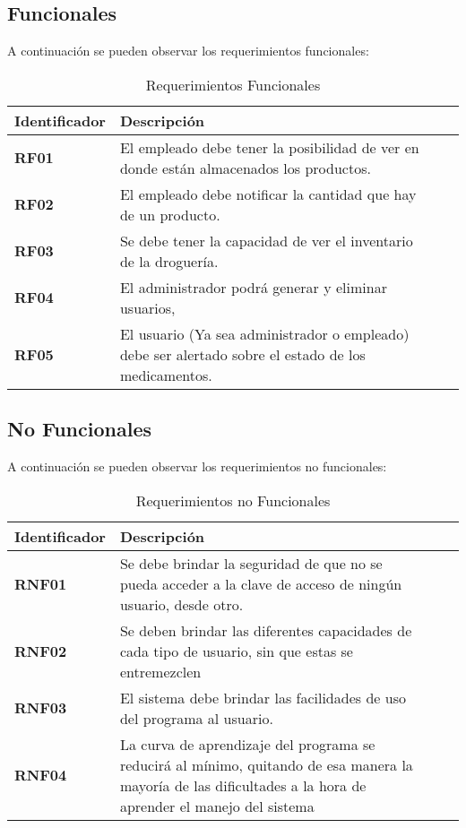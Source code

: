 \subsection{Funcionales}
A continuación se pueden observar los requerimientos funcionales: \\
\begin{table}[h!]
	\begin{center}
		\begin{tabular}{| l |p{10cm} | l |p{30cm}|} 
			\hline
			\textbf{Identificador} & \textbf{Descripci\'on} \\
			\hline
		\textbf{RF01} & El empleado debe tener la posibilidad de ver en donde están almacenados los productos.\\ \hline
		\textbf{RF02} & El empleado debe notificar la cantidad que hay de un producto.\\ \hline
		\textbf{RF03} & Se debe tener la capacidad de ver el inventario de la droguería.\\ \hline
		\textbf{RF04} & El administrador podrá generar y eliminar usuarios,\\ \hline
		\textbf{RF05} & El usuario (Ya sea administrador o empleado) debe ser alertado sobre el estado de los medicamentos.\\ \hline
		\end{tabular}
		\caption{Requerimientos Funcionales}
		\label{reqFunc}
	\end{center}
\end{table}

\newpage
\subsection{No Funcionales}
A continuación se pueden observar los requerimientos no funcionales: \\
\begin{table}[h!]
	\begin{center}
		\begin{tabular}{| l |p{10cm} | l |p{30cm}|} 
			\hline
			\textbf{Identificador} & \textbf{Descripci\'on} \\
			\hline
			\textbf{RNF01} & Se debe brindar la seguridad de que no se pueda acceder a la clave de acceso de ningún usuario, desde otro.\\ \hline
			\textbf{RNF02} & Se deben brindar las diferentes capacidades de cada tipo de usuario, sin que estas se entremezclen\\ \hline
			\textbf{RNF03} & El sistema debe brindar las facilidades de uso del programa al usuario.\\ \hline
			\textbf{RNF04} & La curva de aprendizaje del programa se reducirá al mínimo, quitando de esa manera la mayoría de las dificultades a la hora de aprender el manejo del sistema\\ \hline
		\end{tabular}
		\caption{Requerimientos no Funcionales}
		\label{reqNFunc}
	\end{center}
\end{table}
\newpage

